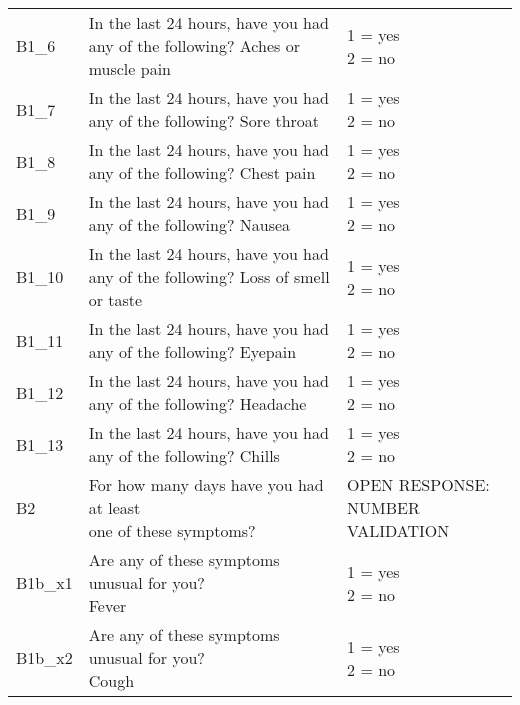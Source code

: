 \begin{tabularx}{\linewidth}{p{1.9cm} <{\RaggedRight}X <{\RaggedRight\arraybackslash}p{4.3cm}}
    B1\_6& \thead{In the last 24 hours, have you had \\any of the following? Aches or muscle pain} & \thead{1 = yes\\2 = no} \\
    B1\_7& \thead{In the last 24 hours, have you had \\any of the following? Sore throat} & \thead{1 = yes\\2 = no} \\
    B1\_8& \thead{In the last 24 hours, have you had \\any of the following? Chest pain} & \thead{1 = yes\\2 = no} \\
    B1\_9& \thead{In the last 24 hours, have you had \\any of the following? Nausea} & \thead{1 = yes\\2 = no} \\
    B1\_10& \thead{In the last 24 hours, have you had \\any of the following? Loss of smell or taste} & \thead{1 = yes\\2 = no} \\
    B1\_11& \thead{In the last 24 hours, have you had \\any of the following? Eyepain} & \thead{1 = yes\\2 = no} \\
    B1\_12& \thead{In the last 24 hours, have you had \\any of the following? Headache} & \thead{1 = yes\\2 = no} \\
    B1\_13& \thead{In the last 24 hours, have you had \\any of the following? Chills} & \thead{1 = yes\\2 = no} \\
    B2 & \thead{For how many days have you had at least \\one of these symptoms?} & \thead{OPEN RESPONSE:\\ NUMBER VALIDATION} \\
    B1b\_x1& \thead{Are any of these symptoms unusual for you?\\Fever} & \thead{1 = yes\\2 = no} \\
    B1b\_x2& \thead{Are any of these symptoms unusual for you?\\Cough} & \thead{1 = yes\\2 = no} \\

\end{tabularx}
